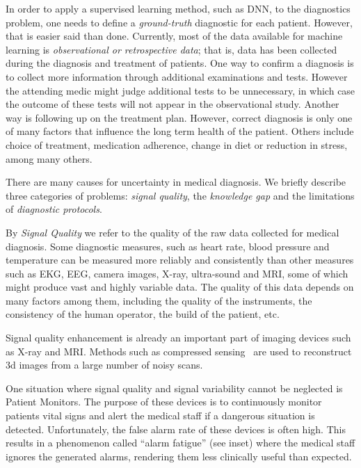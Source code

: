 \documentclass[11pt]{pnas-new}
\begin{document}
In order to apply a supervised learning method, such as  DNN, to the
diagnostics problem, one needs to define a {\em ground-truth} diagnostic for each
patient. However, that is easier said than done. Currently, most of
the data available for machine learning is {\em observational or
retrospective data}; that is, data has been collected
during the diagnosis and treatment of patients.
One way to confirm a diagnosis is to collect more information through
additional examinations and tests. However the attending medic might
judge additional tests to be unnecessary, in which case the outcome of these tests will not
appear in the observational study.
Another way is following up on the treatment plan. However, correct
diagnosis is only one of many factors that influence the long term
health of the patient. Others include choice of treatment, medication
adherence, change in diet or reduction in stress, among many others.


There are many causes for uncertainty in medical diagnosis. We briefly
describe three categories of problems: {\em signal quality}, the {\em
  knowledge gap} and the limitations of {\em diagnostic protocols}.

By {\em Signal Quality} we refer to the quality of the raw data
collected for medical diagnosis. Some diagnostic measures, such
as heart rate, blood pressure and temperature can be measured more reliably
and consistently than other
measures such as EKG, EEG, camera images, X-ray, ultra-sound and MRI, some of which might
produce vast and highly variable data. The quality of this data
depends on many factors among them, including the quality of the instruments, the
consistency of the human operator, the build of the patient, etc.


Signal quality enhancement is already an important part of imaging
devices such as X-ray and MRI. Methods such as compressed
sensing~\cite{lustig2008compressed} are used to reconstruct 3d images
from a large number of noisy scans.

One situation where signal quality and signal variability cannot be
neglected is Patient Monitors.  The purpose of these devices is to
continuously monitor patients vital signs and alert the medical staff
if a dangerous situation is detected. Unfortunately, the false alarm
rate of these devices is often high. This results in a phenomenon
called ``alarm fatigue'' (see inset) where the medical staff ignores
the generated alarms, rendering them less clinically useful than
expected.
\end{document}
